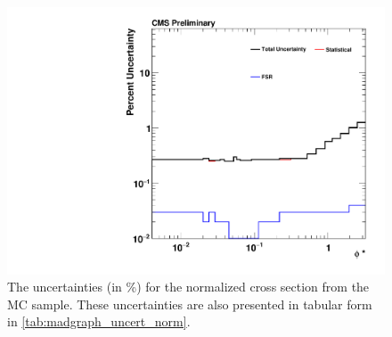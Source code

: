 \begin{figure}[!p]
    \centering
    \includegraphics[width=\textwidth]{figures/madgraph_uncertainty_normalized.pdf}
    \caption[
        The uncertainties for the normalized cross section from the \MADGRAPH
        MC sample.
    ]{
        The uncertainties (in \%) for the normalized cross section from the
        \MADGRAPH MC sample. These uncertainties are also presented in tabular
        form in \cref{tab:madgraph_uncert_norm}.
    }
    \label{fig:madgraph_uncert_norm}
\end{figure}
